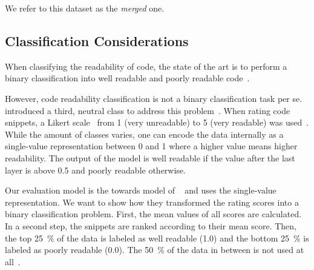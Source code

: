 \documentclass[%
class=scrreprt,
chapterprefix=false,%
open=right,%
twoside=false,%
paper=a4,%
logofile={Logo\_zentral\_farbig\_EN.png},%
thesistype=master,%
UKenglish,%
]{se2thesis}
\theoremstyle{definition}
\newcommand{\citeolddataset}{\cite{buse2009learning, dorn2012general, scalabrino2018comprehensive}}
\begin{document}
	We refer to this dataset as the \textit{merged} one.
	
\subsection{Classification Considerations} \label{Classification Considerations}
	
	When classifying the readability of code, the state of the art is to perform a binary classification into well readable and poorly readable code~\cite{mi2018inception, mi2018improving, sharma2020egan, mi2022towards, mi2022rank}. 
	
	
	However, code readability classification is not a binary classification task per se. \citeauthor{mi2023graph} introduced a third, neutral class to address this problem~\cite{mi2023graph}. 
	When rating code snippets, a Likert scale~\cite{likert1932technique} from 1 (very unreadable) to 5 (very readable) was used~\citeolddataset. 
	While the amount of classes varies, one can encode the data internally as a single-value representation between 0 and 1 where a higher value means higher readability. The output of the model is well readable if the value after the last layer is above 0.5 and poorly readable otherwise.
	
	Our evaluation model is the towards model of \citeauthor{mi2022towards}~\cite{mi2022towards} and uses the single-value representation. We want to show how they transformed the rating scores into a binary classification problem. First, the mean values of all scores are calculated. In a second step, the snippets are ranked according to their mean score. Then, the top 25~\% of the data is labeled as well readable (1.0) and the bottom 25~\% is labeled as poorly readable (0.0). The 50~\% of the data in between is not used at all~\cite{mi2022towards}.
	
\end{document}
